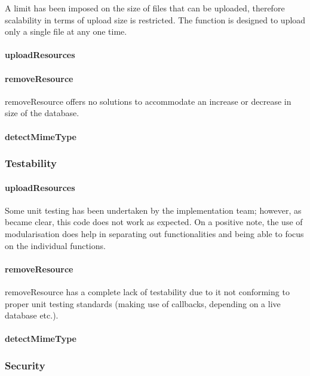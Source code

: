 \documentclass[a4paper]{article}
\begin{document}
A limit has been imposed on the size of files that can be uploaded, therefore scalability in terms of upload size is restricted. The function is designed to upload only a single file at any one time.

\paragraph{uploadResources}

\paragraph{removeResource}
removeResource offers no solutions to accommodate an increase or decrease in size of the database.

\paragraph{detectMimeType}

\subsubsection {Testability}

\paragraph{uploadResources}
Some unit testing has been undertaken by the implementation team; however, as became clear, this code does not work as expected. On a positive note, the use of modularisation does help in separating out functionalities and being able to focus on the individual functions. 

\paragraph{removeResource}
removeResource has a complete lack of testability due to it not conforming to proper unit testing standards (making use of callbacks, depending on a live database etc.).

\paragraph{detectMimeType}

\subsubsection {Security}
\end{document}
